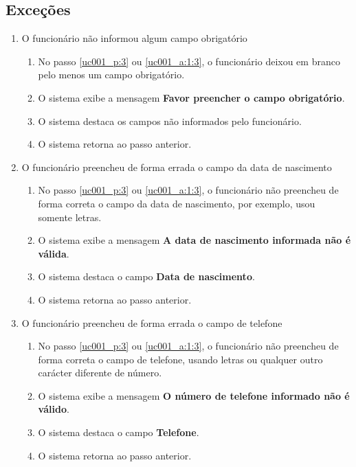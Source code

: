 \subsection{Exceções}

\begin{enumerate}[label=E\arabic*]
	\item O funcionário não informou algum campo obrigatório \label{uc001_e:1}
	\begin{enumerate}[label*=.\arabic*]
		\item[] No passo \ref{uc001_p:3} ou \ref{uc001_a:1:3}, o funcionário deixou em branco pelo menos um campo obrigatório.
		\item O sistema exibe a mensagem \textbf{Favor preencher o campo obrigatório}.
		\item O sistema destaca os campos não informados pelo funcionário.
		\item O sistema retorna ao passo anterior.
	\end{enumerate}

	\item O funcionário preencheu de forma errada o campo da data de nascimento \label{uc001_e:2}
	\begin{enumerate}[label*=.\arabic*]
			\item[] No passo \ref{uc001_p:3} ou \ref{uc001_a:1:3}, o funcionário não preencheu de forma correta o campo da data de nascimento, por exemplo, usou somente letras.				
		\item O sistema exibe a mensagem \textbf{A data de nascimento informada não é válida}.
		\item O sistema destaca o campo \textbf{Data de nascimento}.
		\item O sistema retorna ao passo anterior.
	\end{enumerate}

	\item O funcionário preencheu de forma errada o campo de telefone \label{uc001_e:3}
	\begin{enumerate}[label*=.\arabic*]		
		\item[] No passo \ref{uc001_p:3} ou \ref{uc001_a:1:3}, o funcionário não preencheu de forma correta o campo de telefone, usando letras ou qualquer outro carácter diferente de número.		
		\item O sistema exibe a mensagem \textbf{O número de telefone informado não é válido}.
		\item O sistema destaca o campo \textbf{Telefone}.
		\item O sistema retorna ao passo anterior.
	\end{enumerate}


\end{enumerate}
